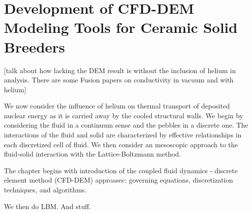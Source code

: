 \chapter{Development of CFD-DEM Modeling Tools for Ceramic Solid Breeders} \label{sec:modeling-cfd-dem}
[talk about how lacking the DEM result is without the inclusion of helium in analysis. There are some Fusion papers on conductivity in vacuum and with helium]

We now consider the influence of helium on thermal transport of deposited nuclear energy as it is carried away by the cooled structural walls. We begin by considering the fluid in a continuum sense and the pebbles in a discrete one. The interactions of the fluid and solid are characterized by effective relationships in each discretized cell of fluid. We then consider an mesoscopic approach to the fluid-solid interaction with the Lattice-Boltzmann method. 

The chapter begins with introduction of the coupled fluid dynamics - discrete element method (CFD-DEM) approasec: governing equations, discretization techniques, and algorithms.

We then do LBM. And stuff.





